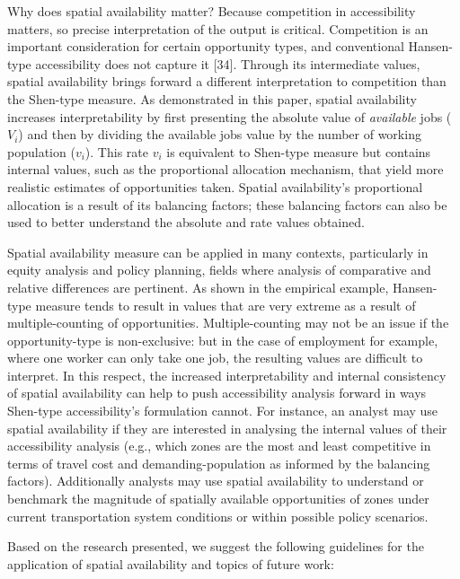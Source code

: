 \documentclass[10pt,letterpaper]{article}
\begin{document}
Why does spatial availability matter? Because competition in
accessibility matters, so precise interpretation of the output is
critical. Competition is an important consideration for certain
opportunity types, and conventional Hansen-type accessibility does not
capture it {[}34{]}. Through its intermediate values, spatial
availability brings forward a different interpretation to competition
than the Shen-type measure. As demonstrated in this paper, spatial
availability increases interpretability by first presenting the absolute
value of \emph{available} jobs (\(V_i\)) and then by dividing the
available jobs value by the number of working population (\(v_i\)). This
rate \(v_i\) is equivalent to Shen-type measure but contains internal
values, such as the proportional allocation mechanism, that yield more
realistic estimates of opportunities taken. Spatial availability's
proportional allocation is a result of its balancing factors; these
balancing factors can also be used to better understand the absolute and
rate values obtained.

Spatial availability measure can be applied in many contexts,
particularly in equity analysis and policy planning, fields where
analysis of comparative and relative differences are pertinent. As shown
in the empirical example, Hansen-type measure tends to result in values
that are very extreme as a result of multiple-counting of opportunities.
Multiple-counting may not be an issue if the opportunity-type is
non-exclusive: but in the case of employment for example, where one
worker can only take one job, the resulting values are difficult to
interpret. In this respect, the increased interpretability and internal
consistency of spatial availability can help to push accessibility
analysis forward in ways Shen-type accessibility's formulation cannot.
For instance, an analyst may use spatial availability if they are
interested in analysing the internal values of their accessibility
analysis (e.g., which zones are the most and least competitive in terms
of travel cost and demanding-population as informed by the balancing
factors). Additionally analysts may use spatial availability to
understand or benchmark the magnitude of spatially available
opportunities of zones under current transportation system conditions or
within possible policy scenarios.

Based on the research presented, we suggest the following guidelines for
the application of spatial availability and topics of future work:
\end{document}
